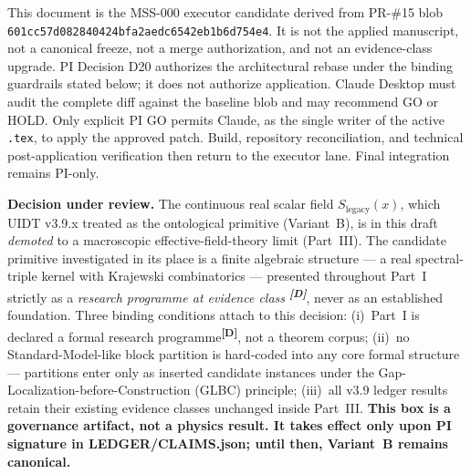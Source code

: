 \documentclass[12pt,a4paper,twoside]{article}
\theoremstyle{plain}
\theoremstyle{definition}
\theoremstyle{remark}
\newcommand{\catmark}[1]{\textsuperscript{\textsf{\textbf{[#1]}}}}
\newcommand{\LegacySx}{S_{\mathrm{legacy}}(x)} %
\newcommand{\Sx}{\LegacySx} %
\begin{document}
\thispagestyle{uidtontology}

\begin{governancebox}
This document is the MSS-000 executor candidate derived from PR-\#15 blob
\texttt{601cc57d082840424bfa2aedc6542eb1b6d754e4}. It is not the applied
manuscript, not a canonical freeze, not a merge authorization, and not an
evidence-class upgrade. PI Decision D20 authorizes the architectural rebase
under the binding guardrails stated below; it does not authorize application.
Claude Desktop must audit the complete diff against the baseline blob and may
recommend GO or HOLD. Only explicit PI GO permits Claude, as the single
writer of the active \texttt{.tex}, to apply the approved patch. Build,
repository reconciliation, and technical post-application verification then
return to the executor lane. Final integration remains PI-only.
\end{governancebox}

\begin{pioverridebox}
\label{box:pi-decision-d19}
\textbf{Decision under review.} The continuous real scalar field $\Sx$,
which UIDT v3.9.x treated as the ontological primitive (Variant~B), is in
this draft \emph{demoted} to a macroscopic effective-field-theory limit
(Part~III). The candidate primitive investigated in its place is a finite
algebraic structure --- a real spectral-triple kernel with Krajewski
combinatorics --- presented throughout Part~I strictly as a
\emph{research programme at evidence class \catmark{D}}, never as an
established foundation. Three binding conditions attach to this decision:
(i)~Part~I is declared a formal research programme\catmark{D}, not a
theorem corpus; (ii)~no Standard-Model-like block partition is hard-coded
into any core formal structure --- partitions enter only as inserted
candidate instances under the Gap-Localization-before-Construction (GLBC)
principle; (iii)~all v3.9 ledger results retain their existing evidence
classes unchanged inside Part~III. \textbf{This box is a governance
artifact, not a physics result. It takes effect only upon PI signature in
LEDGER/CLAIMS.json; until then, Variant~B remains canonical.}
\end{pioverridebox}
\end{document}
